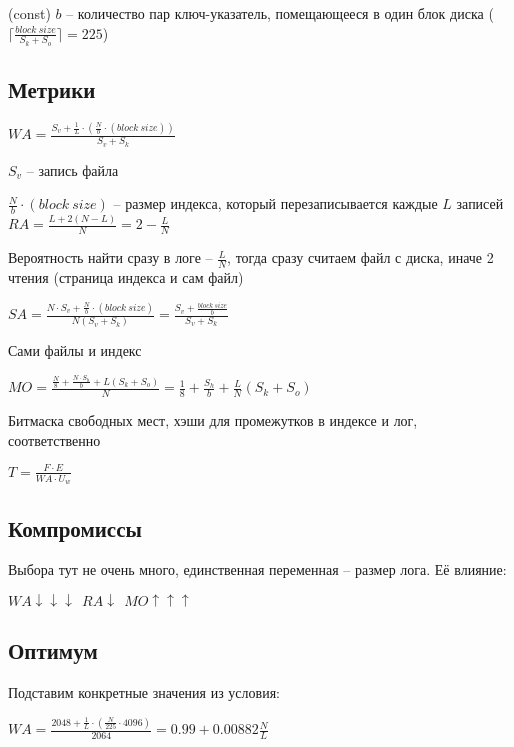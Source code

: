 (const) $b$ -- количество пар ключ-указатель, помещающееся в один блок диска ($\lceil\frac{block\ size}{S_k + S_o}\rceil = 225$)

\subsection*{Метрики}

\large$WA = \frac{S_v + \frac{1}{L}\cdot(\frac{N}{b}\cdot (block\ size))}{S_v + S_k}$\normalsize

$S_v$ -- запись файла

$\frac{N}{b}\cdot (block\ size)$ -- размер индекса, который перезаписывается каждые $L$ записей\\

\large$RA = \frac{L + 2(N-L)}{N} = 2 - \frac{L}{N}$\normalsize

Вероятность найти сразу в логе -- $\frac{L}{N}$, тогда сразу считаем файл с диска, иначе 2 чтения (страница индекса и сам файл)

\large$SA = \frac{N\cdot S_v + \frac{N}{b}\cdot (block\ size)}{N(S_v + S_k)} = \frac{S_v + \frac{block\ size}{b}}{S_v + S_k}$\normalsize

Сами файлы и индекс

\large$MO = \frac{\frac{N}{8} + \frac{N\cdot S_h}{b} + L(S_k + S_o)}{N} = \frac{1}{8} + \frac{S_h}{b} + \frac{L}{N}(S_k + S_o)$\normalsize

Битмаска свободных мест, хэши для промежутков в индексе и лог, соответственно

\large$T = \frac{F\cdot E}{WA\cdot U_w}$\normalsize

\subsection*{Компромиссы}

Выбора тут не очень много, единственная переменная -- размер лога. Её влияние:

$WA\downarrow\downarrow\downarrow\ \ RA \downarrow\ \ MO \uparrow\uparrow\uparrow$

\subsection*{Оптимум}

Подставим конкретные значения из условия:

\large$WA = \frac{2048 + \frac{1}{L}\cdot(\frac{N}{225}\cdot 4096)}{2064} = 0.99 + 0.00882\frac{N}{L}$\normalsize

